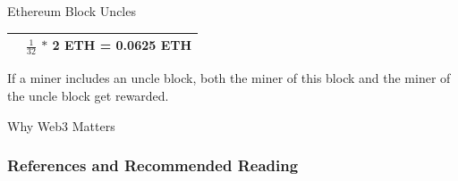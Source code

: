 \documentclass[handout]{beamer}
\begin{document}
\begin{frame}{Ethereum Block Uncles}
{{\begin{tabularx}{300pt}{X X}
			\rowcolor{lightergray}{\footnotesize Uncle Block Inclusion} &{\footnotesize $\frac{1} {32}$ \hspace{1pt} $*$ 2 ETH = 0.0625 ETH}  
			\bigstrut \\
			\bottomrule
		\end{tabularx}
	}
\center 
\begin{tiny}
If a miner includes an uncle block, both the miner of this block and the miner of
the uncle block get rewarded.
\end{tiny}
\vspace{0.5em} }
\end{frame}

\begin{frame}{Why Web3 Matters}
	\begin{figure}
		
	\end{figure}
\end{frame}


\begin{frame}%
\frametitle{References and Recommended Reading}
	
	
\end{frame}
\end{document}
